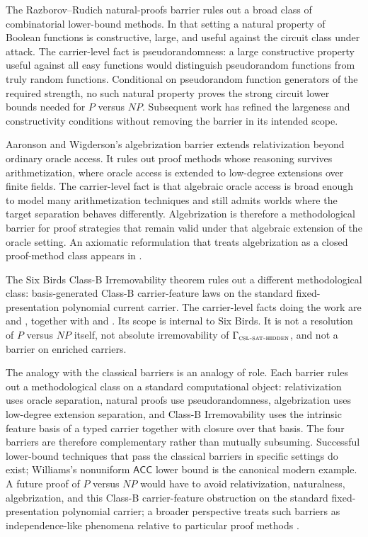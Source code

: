\documentclass[11pt]{article}
\newcommand{\CSLSATHidden}{\Gamma_{\textsc{csl-sat-hidden}}}
\theoremstyle{definition}
\begin{document}
The Razborov--Rudich natural-proofs barrier
\citep{RazborovRudich1997NaturalProofs} rules out a broad class of
combinatorial lower-bound methods.  In that setting a natural property
of Boolean functions is constructive, large, and useful against the
circuit class under attack.  The carrier-level fact is
pseudorandomness: a large constructive property useful against all easy
functions would distinguish pseudorandom functions from truly random
functions.  Conditional on pseudorandom function generators of the
required strength, no such natural property proves the strong circuit
lower bounds needed for \(P\) versus \(NP\).  Subsequent work has
refined the largeness and constructivity conditions
\citep{Chow2011AlmostNaturalProofs} without removing the barrier in its
intended scope.

Aaronson and Wigderson's algebrization barrier
\citep{AaronsonWigderson2009Algebrization} extends relativization
beyond ordinary oracle access.  It rules out proof methods whose
reasoning survives arithmetization, where oracle access is extended to
low-degree extensions over finite fields.  The carrier-level fact is
that algebraic oracle access is broad enough to model many
arithmetization techniques and still admits worlds where the target
separation behaves differently.  Algebrization is therefore a
methodological barrier for proof strategies that remain valid under
that algebraic extension of the oracle setting.  An axiomatic
reformulation that treats algebrization as a closed proof-method class
appears in
\citep{ImpagliazzoKabanetsKolokolova2009AxiomaticAlgebrization}.

The Six Birds Class-B Irremovability theorem rules out a different
methodological class: basis-generated Class-B carrier-feature laws on
the standard fixed-presentation polynomial current carrier.  The
carrier-level facts doing the work are
 and
, together with
 and
.  Its scope is internal to
Six Birds.  It is not a resolution of \(P\) versus \(NP\) itself, not
absolute irremovability of \(\CSLSATHidden\), and not a barrier on
enriched carriers.

The analogy with the classical barriers is an analogy of role.  Each
barrier rules out a methodological class on a standard computational
object: relativization uses oracle separation, natural proofs use
pseudorandomness, algebrization uses low-degree extension separation,
and Class-B Irremovability uses the intrinsic feature basis of a typed
carrier together with closure over that basis.  The four barriers are
therefore complementary rather than mutually subsuming.  Successful
lower-bound techniques that pass the classical barriers in specific
settings do exist; Williams's nonuniform \(\mathsf{ACC}\) lower bound
\citep{Williams2014ACCLowerBounds} is the canonical modern example.  A
future proof of \(P\) versus \(NP\) would have to avoid relativization,
naturalness, algebrization, and this Class-B carrier-feature
obstruction on the standard fixed-presentation polynomial carrier; a
broader perspective treats such barriers as independence-like phenomena
relative to particular proof methods \citep{Kolokolova2016BarriersIndependence}.
\end{document}
